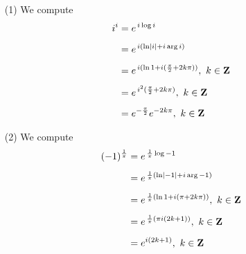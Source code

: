\begin{example}\hfill
\begin{multicols}{2}
\begin{itemize}
\item[(1)] We compute 
\begin{align*}
i^i &= e^{\,i\log i}\\[0.5em]
&= e^{\,i(\ln \left\lvert i\right\rvert + i\arg i)}\\[0.5em]
&= e^{\,i(\ln 1 + i(\frac{\pi}{2} + 2k\pi))},\ k \in \mathbf Z\\[0.5em]
&= e^{\,i^2(\frac{\pi}{2} + 2k\pi)},\ k \in \mathbf Z\\[0.5em]
&= e^{-\frac{\pi}{2}}e^{-2k\pi},\ k \in \mathbf Z
\end{align*}
\item[(2)] We compute
\begin{align*}
(-1)^{\frac{1}{\pi}} &= e^{\,\frac{1}{\pi}\log -1}\\[0.5em]
&= e^{\,\frac{1}{\pi}(\ln \left\lvert-1\right\rvert + i\arg -1)}\\[0.5em]
&= e^{\,\frac{1}{\pi}(\ln 1 + i(\pi + 2k\pi))},\ k \in \mathbf Z\\[0.5em]
&= e^{\,\frac{1}{\pi}(\pi i(2k + 1))},\ k \in \mathbf Z\\[0.5em]
&= e^{i(2k+1)},\ k \in \mathbf Z
\end{align*}
\end{itemize}
\end{multicols}
\end{example}

